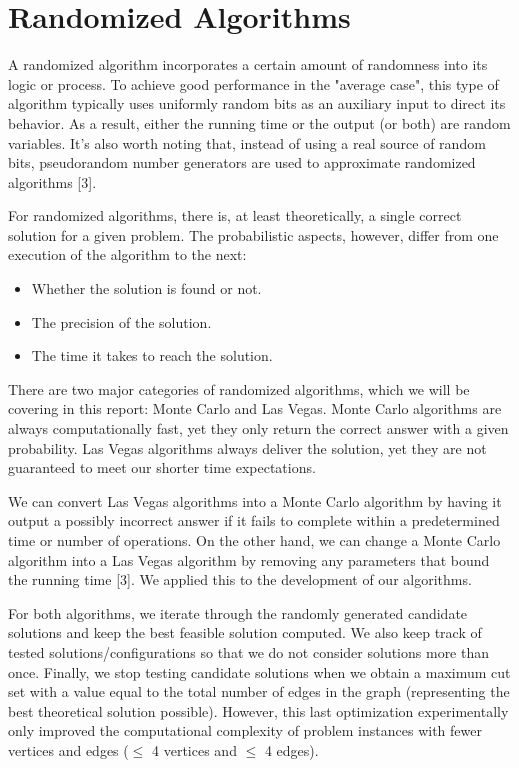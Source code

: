 \documentclass[]{revdetua}
\begin{document}
\section{Randomized Algorithms}

A randomized algorithm incorporates a certain amount of randomness into its logic or process. To achieve good performance in the "average case", this type of algorithm typically uses uniformly random bits as an auxiliary input to direct its behavior. As a result, either the running time or the output (or both) are random variables. It's also worth noting that, instead of using a real source of random bits, pseudorandom number generators are used to approximate randomized algorithms [3].

For randomized algorithms, there is, at least theoretically, a single correct solution for a given problem. The probabilistic aspects, however, differ from one execution of the algorithm to the next:

\begin{itemize}
\item Whether the solution is found or not.
\item The precision of the solution.
\item The time it takes to reach the solution. 
\end{itemize}

There are two major categories of randomized algorithms, which we will be covering in this report: Monte Carlo and Las Vegas. Monte Carlo algorithms are always computationally fast, yet they only return the correct answer with a given probability. Las Vegas algorithms always deliver the solution, yet they are not guaranteed to meet our shorter time expectations.

We can convert Las Vegas algorithms into a Monte Carlo algorithm by having it output a possibly incorrect answer if it fails to complete within a predetermined time or number of operations. On the other hand, we can change a Monte Carlo algorithm into a Las Vegas algorithm by removing any parameters that bound the running time [3]. We applied this to the development of our algorithms.

For both algorithms, we iterate through the randomly generated candidate solutions and keep the best feasible solution computed. We also keep track of tested solutions/configurations so that we do not consider solutions more than once. Finally, we stop testing candidate solutions when we obtain a maximum cut set with a value equal to the total number of edges in the graph (representing the best theoretical solution possible). However, this last optimization experimentally only improved the computational complexity of problem instances with fewer vertices and edges ($\leq$ 4 vertices and $\leq$ 4 edges).
\end{document}
